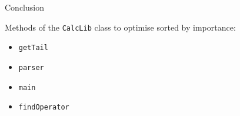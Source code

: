 \documentclass[12pt]{article}
\begin{document}
    \newpage

    \begin{center}
    \large{Conclusion}
    \end{center}

    \bigskip

    \normalsize{Methods of the \texttt{CalcLib} class to optimise sorted by importance:}
    \begin{itemize}
      \item \texttt{getTail}
      \item \texttt{parser}
      \item \texttt{main}
      \item \texttt{findOperator}
    \end{itemize}
\end{document}
